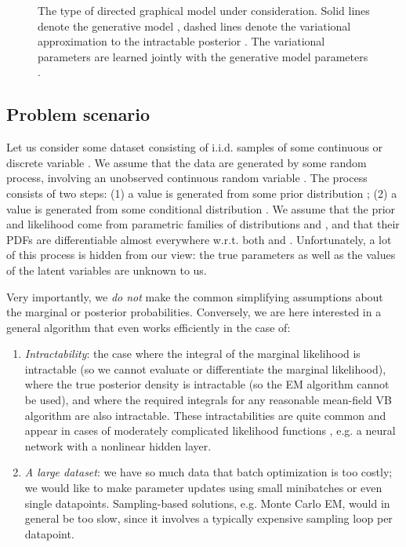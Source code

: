 \documentclass{article} \usepackage{nips13submit_e,times}
\theoremstyle{definition}
\theoremstyle{definition}
\begin{document}
\begin{figure}[t]
\begin{center}
\end{center}
\caption{
The type of directed graphical model under consideration. Solid lines denote the generative model , dashed lines denote the variational approximation  to the intractable posterior . The variational parameters  are learned jointly with the generative model parameters .
}
\end{figure}

\subsection{Problem scenario}
\label{sec:problem}


Let us consider some dataset  consisting of  i.i.d. samples of some continuous or discrete variable . We assume that the data are generated by some random process, involving an unobserved continuous random variable . The process consists of two steps: (1) a value  is generated from some prior distribution ; (2) a value  is generated from some conditional distribution .  We assume that the prior  and likelihood  come from parametric families of distributions  and , and that their PDFs are differentiable almost everywhere w.r.t. both  and . Unfortunately, a lot of this process is hidden from our view: the true parameters  as well as the values of the latent variables  are unknown to us.  

Very importantly, we \emph{do not} make the common simplifying assumptions about the marginal or posterior probabilities. Conversely, we are here interested in a general algorithm that even works efficiently in the case of:
\begin{enumerate}
\item \emph{Intractability}: the case where the integral of the marginal likelihood  is intractable (so we cannot evaluate or differentiate the marginal likelihood), where the true posterior density  is intractable (so the EM algorithm cannot be used), and where the required integrals for any reasonable mean-field VB algorithm are also intractable. These intractabilities are quite common and appear in cases of moderately complicated likelihood functions , e.g. a neural network with a nonlinear hidden layer.
\item \emph{A large dataset}: we have so much data that batch optimization is too costly; we would like to make parameter updates using small minibatches or even single datapoints. Sampling-based solutions, e.g. Monte Carlo EM, would in general be too slow, since it involves a typically expensive sampling loop per datapoint.
\end{enumerate}
\end{document}

